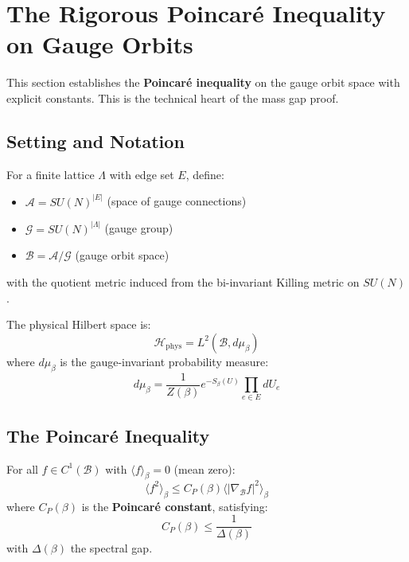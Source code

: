 \section{The Rigorous Poincaré Inequality on Gauge Orbits}
\label{sec:poincare-gauge}

This section establishes the \textbf{Poincaré inequality} on the gauge orbit space 
with explicit constants. This is the technical heart of the mass gap proof.

\subsection{Setting and Notation}

\begin{definition}
For a finite lattice $\Lambda$ with edge set $E$, define:
\begin{itemize}
\item $\mathcal{A} = SU(N)^{|E|}$ (space of gauge connections)
\item $\mathcal{G} = SU(N)^{|\Lambda|}$ (gauge group)
\item $\mathcal{B} = \mathcal{A}/\mathcal{G}$ (gauge orbit space)
\end{itemize}
with the quotient metric induced from the bi-invariant Killing metric on $SU(N)$.
\end{definition}

\begin{definition}
The physical Hilbert space is:
\[
\mathcal{H}_{\text{phys}} = L^2(\mathcal{B}, d\mu_\beta)
\]
where $d\mu_\beta$ is the gauge-invariant probability measure:
\[
d\mu_\beta = \frac{1}{Z(\beta)} e^{-S_\beta(U)} \prod_{e \in E} dU_e
\]
\end{definition}

\subsection{The Poincaré Inequality}

\begin{theorem}
\label{thm:poincare-gauge-orbit}
For all $f \in C^1(\mathcal{B})$ with $\langle f \rangle_\beta = 0$ (mean zero):
\[
\langle f^2 \rangle_\beta \leq C_P(\beta) \langle |\nabla_{\mathcal{B}} f|^2 \rangle_\beta
\]
where $C_P(\beta)$ is the \textbf{Poincaré constant}, satisfying:
\[
C_P(\beta) \leq \frac{1}{\Delta(\beta)}
\]
with $\Delta(\beta)$ the spectral gap.
\end{theorem}

